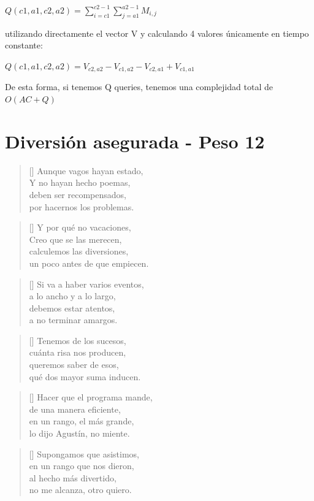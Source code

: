 \documentclass[a4paper]{article}
\newcommand{\verso}[1] {
\settowidth{\versewidth}{123456789012345678901234567890}%
\begin{minipage}[t]{\dimexpr\versewidth+1pt\relax}
\begin{verse}[\versewidth]
{\fontfamily{qzc}\selectfont\large
  #1
}
\end{verse}
\end{minipage}\bigskip
}
\begin{document}
\begin{center}
$Q(c1 , a1 , c2 , a2 ) = \sum_{i=c1}^{c2-1}\sum_{j=a1}^{a2-1} M_{i,j} $
\end{center}

utilizando directamente el vector V y calculando 4 valores únicamente en tiempo constante:

\begin{center}
$Q(c1 , a1 , c2 , a2 ) = V_{c2,a2} - V_{c1,a2} - V_{c2,a1} + V_{c1,a1} $
\end{center}

De esta forma, si tenemos Q queries, tenemos una complejidad total de $O(AC +Q)$



\pagebreak
\section{Diversión asegurada - Peso 12}
\verso{ %
Aunque vagos hayan estado,\\
Y no hayan hecho poemas,\\
deben ser recompensados,\\
por hacernos los problemas.\\
}
\verso{ %
Y por qué no vacaciones,\\
Creo que se las merecen,\\
calculemos las diversiones,\\
un poco antes de que empiecen.\\
}
\verso{ %
Si va a haber varios eventos,\\
a lo ancho y a lo largo,\\
debemos estar atentos,\\
a no terminar amargos.\\
}
\verso{ %
Tenemos de los sucesos,\\
cuánta risa nos producen,\\
queremos saber de esos,\\
qué dos mayor suma inducen.\\
}
\verso{ %
Hacer que el programa mande,\\
de una manera eficiente,\\
en un rango, el más grande,\\
lo dijo Agustín, no miente.\\
}
\verso{ %
Supongamos que asistimos,\\
en un rango que nos dieron,\\
al hecho más divertido,\\
no me alcanza, otro quiero.\\
}
\end{document}
